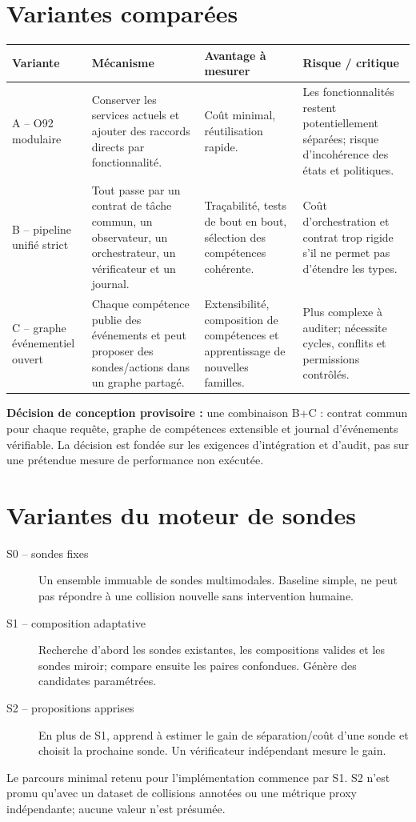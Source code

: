 \documentclass[11pt,a4paper,oneside]{report}
\begin{document}
\section{Variantes comparées}
\begin{longtable}{p{2.4cm}p{4.1cm}p{4.1cm}p{3.2cm}}
\toprule
Variante & Mécanisme & Avantage à mesurer & Risque / critique \\
\midrule
A -- O92 modulaire & Conserver les services actuels et ajouter des raccords directs par fonctionnalité. & Coût minimal, réutilisation rapide. & Les fonctionnalités restent potentiellement séparées; risque d'incohérence des états et politiques. \\
B -- pipeline unifié strict & Tout passe par un contrat de tâche commun, un observateur, un orchestrateur, un vérificateur et un journal. & Traçabilité, tests de bout en bout, sélection des compétences cohérente. & Coût d'orchestration et contrat trop rigide s'il ne permet pas d'étendre les types. \\
C -- graphe événementiel ouvert & Chaque compétence publie des événements et peut proposer des sondes/actions dans un graphe partagé. & Extensibilité, composition de compétences et apprentissage de nouvelles familles. & Plus complexe à auditer; nécessite cycles, conflits et permissions contrôlés. \\
\bottomrule
\end{longtable}

\textbf{Décision de conception provisoire :} une combinaison B+C : contrat commun pour chaque requête, graphe de compétences extensible et journal d'événements vérifiable. La décision est fondée sur les exigences d'intégration et d'audit, pas sur une prétendue mesure de performance non exécutée.

\section{Variantes du moteur de sondes}
\begin{description}
\item[S0 -- sondes fixes] Un ensemble immuable de sondes multimodales. Baseline simple, ne peut pas répondre à une collision nouvelle sans intervention humaine.
\item[S1 -- composition adaptative] Recherche d'abord les sondes existantes, les compositions valides et les sondes miroir; compare ensuite les paires confondues. Génère des candidates paramétrées.
\item[S2 -- propositions apprises] En plus de S1, apprend à estimer le gain de séparation/coût d'une sonde et choisit la prochaine sonde. Un vérificateur indépendant mesure le gain.
\end{description}
Le parcours minimal retenu pour l'implémentation commence par S1. S2 n'est promu qu'avec un dataset de collisions annotées ou une métrique proxy indépendante; aucune valeur n'est présumée.
\end{document}
